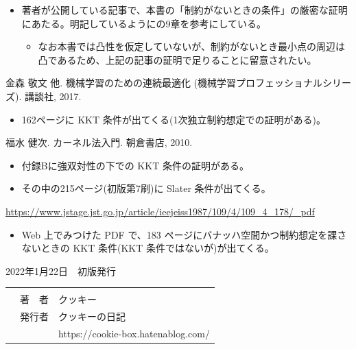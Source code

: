 \documentclass[b5paper,xelatex,ja=standard,10pt]{bxjsarticle}
\begin{document}
\begin{thebibliography}{99}
    \begin{itemize}
        \item 著者が公開している記事で、本書の「制約がないときの条件」の厳密な証明にあたる。明記しているように\cite{boyd}の9章を参考にしている。
        \begin{itemize}
            \item なお本書では凸性を仮定していないが、制約がないとき最小点の周辺は凸であるため、上記の記事の証明で足りることに留意されたい。
        \end{itemize}
    \end{itemize}
     金森 敬文 他. 機械学習のための連続最適化 (機械学習プロフェッショナルシリーズ). 講談社, 2017.
    \begin{itemize}
        \item 162ページに KKT 条件が出てくる(1次独立制約想定での証明がある)。
    \end{itemize}
     福水 健次. カーネル法入門. 朝倉書店, 2010.
    \begin{itemize}
        \item 付録Bに強双対性の下での KKT 条件の証明がある。
        \item その中の215ページ(初版第7刷)に Slater 条件が出てくる。
    \end{itemize}
     \url{https://www.jstage.jst.go.jp/article/ieejeiss1987/109/4/109_4_178/_pdf}
    \begin{itemize}
        \item Web 上でみつけた PDF で、183 ページにバナッハ空間かつ制約想定を課さないときの KKT 条件(KKT 条件ではないが)が出てくる。
    \end{itemize}
\end{thebibliography}


\clearpage
\vspace*{16.7cm}

\begin{OKUDUKE}[title={\textbf{\large KKT条件の話}}]
2022年1月22日　初版発行 \\
{
\renewcommand\arraystretch{0.9}
\begin{tabular}{p{4cm}rp{5.9cm}}
 &  &  \\
 & 著　者 & クッキー \\
 & 発行者 & クッキーの日記 \\
 & & https://cookie-box.hatenablog.com/ 
\end{tabular}
}
\end{OKUDUKE}
\thispagestyle{empty}
\end{document}
